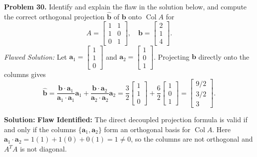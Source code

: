 \documentclass[11pt, letterpaper]{article}
\theoremstyle{definition}
\theoremstyle{remark}
\begin{document}
\textbf{Problem 30.} Identify and explain the flaw in the solution below, and compute the correct orthogonal projection $\hat{\mathbf{b}}$ of $\mathbf{b}$ onto $\operatorname{Col} A$ for
\[
A = \begin{bmatrix} 1 & 1 \\ 1 & 0 \\ 0 & 1 \end{bmatrix}, \quad \mathbf{b} = \begin{bmatrix} 2 \\ 1 \\ 4 \end{bmatrix}.
\]
\textit{Flawed Solution:} Let $\mathbf{a}_1 = \begin{bmatrix} 1 \\ 1 \\ 0 \end{bmatrix}$ and $\mathbf{a}_2 = \begin{bmatrix} 1 \\ 0 \\ 1 \end{bmatrix}$. Projecting $\mathbf{b}$ directly onto the columns gives
\[
\hat{\mathbf{b}} = \frac{\mathbf{b} \cdot \mathbf{a}_1}{\mathbf{a}_1 \cdot \mathbf{a}_1} \mathbf{a}_1 + \frac{\mathbf{b} \cdot \mathbf{a}_2}{\mathbf{a}_2 \cdot \mathbf{a}_2} \mathbf{a}_2 = \frac{3}{2} \begin{bmatrix} 1 \\ 1 \\ 0 \end{bmatrix} + \frac{6}{2} \begin{bmatrix} 1 \\ 0 \\ 1 \end{bmatrix} = \begin{bmatrix} 9/2 \\ 3/2 \\ 3 \end{bmatrix}.
\]

\textbf{Solution:}
\textbf{Flaw Identified:} The direct decoupled projection formula is valid if and only if the columns $\{\mathbf{a}_1, \mathbf{a}_2\}$ form an orthogonal basis for $\operatorname{Col} A$. Here $\mathbf{a}_1 \cdot \mathbf{a}_2 = 1(1) + 1(0) + 0(1) = 1 \neq 0$, so the columns are not orthogonal and $A^T A$ is not diagonal.
\end{document}
